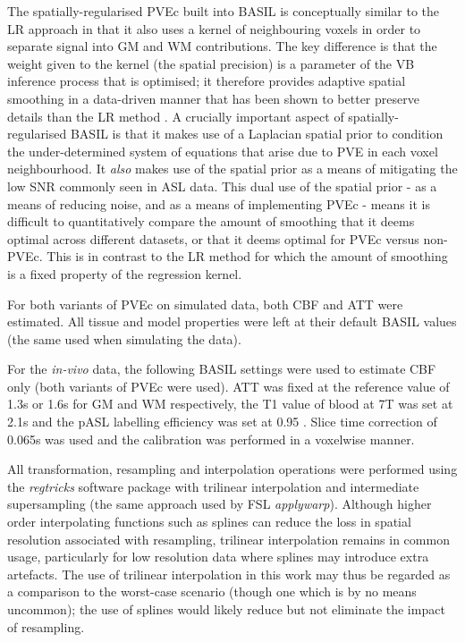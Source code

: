 The spatially-regularised PVEc built into BASIL is conceptually similar to the LR approach in that it also uses a kernel of neighbouring voxels in order to separate signal into GM and WM contributions. The key difference is that the weight given to the kernel (the spatial precision) is a parameter of the VB inference process that is optimised; it therefore provides adaptive spatial smoothing in a data-driven manner that has been shown to better preserve details than the LR method \cite{Zhao2017a}. A crucially important aspect of spatially-regularised BASIL is that it makes use of a Laplacian spatial prior to condition the under-determined system of equations that arise due to PVE in each voxel neighbourhood. It \textit{also} makes use of the spatial prior as a means of mitigating the low SNR commonly seen in ASL data. This dual use of the spatial prior - as a means of reducing noise, and as a means of implementing PVEc - means it is difficult to quantitatively compare the amount of smoothing that it deems optimal across different datasets, or that it deems optimal for PVEc versus non-PVEc. This is in contrast to the LR method for which the amount of smoothing is a fixed property of the regression kernel.

For both variants of PVEc on simulated data, both CBF and ATT were estimated. All tissue and model properties were left at their default BASIL values (the same used when simulating the data). 

For the \textit{in-vivo} data, the following BASIL settings were used to estimate CBF only (both variants of PVEc were used). ATT was fixed at the reference value of 1.3s or 1.6s for GM and WM respectively, the T1 value of blood at 7T was set at 2.1s and the pASL labelling efficiency was set at 0.95 \cite{Zhang2013}. Slice time correction of 0.065s was used and the calibration was performed in a voxelwise manner. 

All transformation, resampling and interpolation operations were performed using the \textit{regtricks} software package \cite{regtricks} with trilinear interpolation and intermediate supersampling (the same approach used by FSL \textit{applywarp}). Although higher order interpolating functions such as splines can reduce the loss in spatial resolution associated with resampling, trilinear interpolation remains in common usage, particularly for low resolution data where splines may introduce extra artefacts. The use of trilinear interpolation in this work may thus be regarded as a comparison to the worst-case scenario (though one which is by no means uncommon); the use of splines would likely reduce but not eliminate the impact of resampling. 


